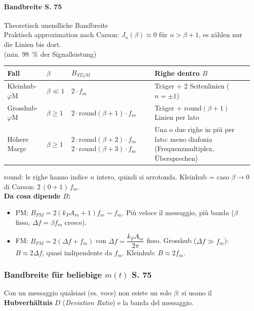 \paragraph{Bandbreite S. 75}
Theoretisch unendliche Bandbreite \\
Praktisch approximation nach Carson: $J_n(\beta)\approx 0$ für $n>\beta+1$, es zählen nur die Linien bis dort. \\[2pt]
 (min. \qty{98}{\%} der Signalleistung)\\[4pt]
{\renewcommand{\arraystretch}{1.3}
\begin{tabularx}{\linewidth}{|>{\raggedright\arraybackslash}p{.2\linewidth}|>{\centering\arraybackslash}p{.12\linewidth}|>{\centering\arraybackslash}p{.26\linewidth}|>{\raggedright\arraybackslash}X|}
	\hline
	\textbf{Fall} & $\beta$ & $B_{ST\varphi M}$ & \textbf{Righe dentro $B$} \\ \hline
	Kleinhub-$\varphi$M & $\beta \ll 1$ & $2\cdot f_m$ & Träger + 2 Seitenlinien ($n=\pm 1$) \\ \hline
	Grosshub-$\varphi$M & $\beta \ge 1$ & $2\cdot \mathrm{round}(\beta+1)\cdot f_m$ & Träger + $\mathrm{round}(\beta+1)$ Linien per lato \\ \hline
	Höhere Marge & $\beta \ge 1$ & $2\cdot \mathrm{round}(\beta+2)\cdot f_m$ \newline $2\cdot \mathrm{round}(\beta+3)\cdot f_m$ & Una o due righe in più per lato: meno diafonia (Frequenzmultiplex, Übersprechen) \\ \hline
\end{tabularx}}
{\small $\mathrm{round}$: le righe hanno indice $n$ intero, quindi si arrotonda. Kleinhub = caso $\beta\to 0$ di Carson: $2\,(0+1)\,f_m$.}\\[4pt]
\textbf{Da cosa dipende $B$:}
\begin{itemize}
	\setlength{\itemsep}{0pt}
	\item PM: $B_{PM}=2(k_PA_m+1)f_m\sim f_m$. Più veloce il messaggio, più banda ($\beta$ fisso, $\Delta f=\beta f_m$ cresce).
	\item FM: $B_{FM}=2(\Delta f+f_m)$ con $\Delta f=\dfrac{k_FA_m}{2\pi}$ fisso. Grosshub ($\Delta f\gg f_m$): $B\approx 2\Delta f$, quasi indipendente da $f_m$. Kleinhub: $B\approx 2f_m$.
\end{itemize}

\subsubsection{Bandbreite für beliebige $m(t)$ S. 75}
Con un messaggio qualsiasi (es. voce) non esiste un solo $\beta$: si usano il \textbf{Hubverhältnis} $D$ (\emph{Deviation Ratio}) e la banda del messaggio.

